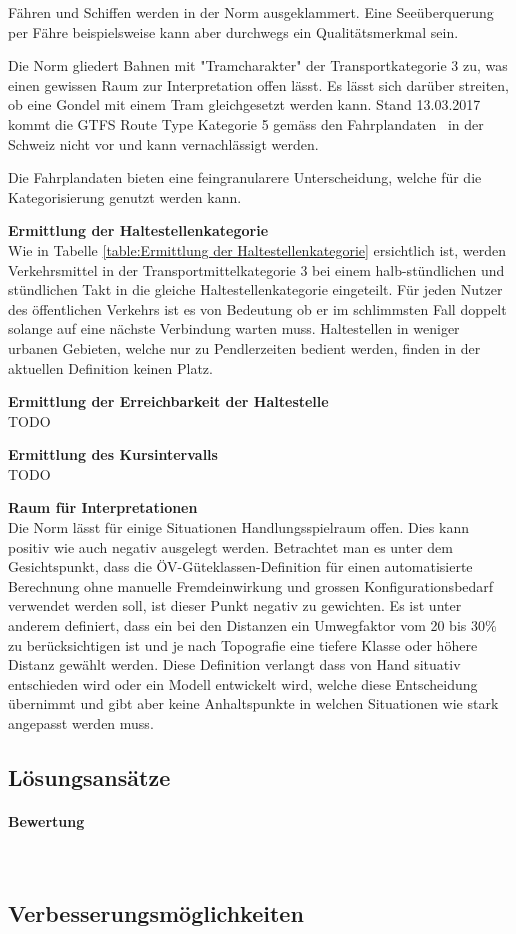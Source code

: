 Fähren und Schiffen werden in der Norm ausgeklammert.
Eine Seeüberquerung per Fähre beispielsweise kann aber durchwegs ein Qualitätsmerkmal sein.

Die Norm gliedert Bahnen mit "Tramcharakter" der Transportkategorie 3 zu, was einen gewissen Raum zur Interpretation offen lässt.
Es lässt sich darüber streiten, ob eine Gondel mit einem Tram gleichgesetzt werden kann.
Stand 13.03.2017 kommt die GTFS Route Type Kategorie 5 gemäss den Fahrplandaten~\cite{gtfs_spec} in der Schweiz nicht vor und kann vernachlässigt werden.

Die Fahrplandaten bieten eine feingranularere Unterscheidung, welche für die Kategorisierung genutzt werden kann.

\textbf{Ermittlung der Haltestellenkategorie}\\
Wie in Tabelle \ref{table:Ermittlung der Haltestellenkategorie} ersichtlich ist, werden Verkehrsmittel in der Transportmittelkategorie 3 bei einem halb-stündlichen und stündlichen Takt in die gleiche Haltestellenkategorie eingeteilt.
Für jeden Nutzer des öffentlichen Verkehrs ist es von Bedeutung ob er im schlimmsten Fall doppelt solange auf eine nächste Verbindung warten muss.
Haltestellen in weniger urbanen Gebieten, welche nur zu Pendlerzeiten bedient werden, finden in der aktuellen Definition keinen Platz.

\textbf{Ermittlung der Erreichbarkeit der Haltestelle}\\
TODO

\textbf{Ermittlung des Kursintervalls}\\
TODO

\textbf{Raum für Interpretationen}\\
Die Norm lässt für einige Situationen Handlungsspielraum offen.
Dies kann positiv wie auch negativ ausgelegt werden.
Betrachtet man es unter dem Gesichtspunkt, dass die \acs{ÖV}-Güteklassen-Definition für einen automatisierte Berechnung ohne manuelle Fremdeinwirkung und grossen Konfigurationsbedarf verwendet werden soll, ist dieser Punkt negativ zu gewichten.
Es ist unter anderem definiert, dass ein bei den Distanzen ein Umwegfaktor vom 20 bis 30\% zu berücksichtigen ist und je nach Topografie eine tiefere Klasse oder höhere Distanz gewählt werden.
Diese Definition verlangt dass von Hand situativ entschieden wird oder ein Modell entwickelt wird, welche diese Entscheidung übernimmt und gibt aber keine Anhaltspunkte in welchen Situationen wie stark angepasst werden muss.

\subsection{Lösungsansätze}
\label{Stand der Technik:Lösungsansätze}


\paragraph{Bewertung}~\\


\subsection{Verbesserungsmöglichkeiten}
\label{Stand der Technik:Verbesserungsmöglichkeiten}

